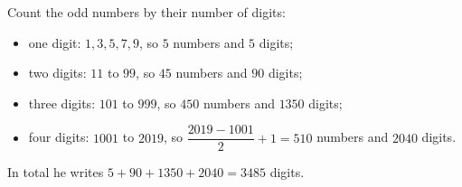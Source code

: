 Count the odd numbers by their number of digits:
\begin{itemize}
\item one digit: $1,3,5,7,9$, so $5$ numbers and $5$ digits;
\item two digits: $11$ to $99$, so $45$ numbers and $90$ digits;
\item three digits: $101$ to $999$, so $450$ numbers and $1350$ digits;
\item four digits: $1001$ to $2019$, so $\dfrac{2019-1001}{2}+1=510$ numbers and $2040$ digits.
\end{itemize}
In total he writes $5+90+1350+2040=\boxed{3485}$ digits.
